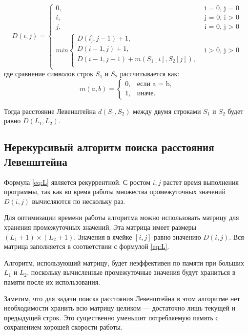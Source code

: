 \begin{equation}
	\label{eq:L}
	D(i, j) =
	\begin{cases}
		0, &\text{i = 0, j = 0}\\
		i, &\text{j = 0, i > 0}\\
		j, &\text{i = 0, j > 0}\\
		min \begin{cases}
			D(i], j - 1) + 1,\\
			D(i - 1, j) + 1,\\
			D(i - 1, j - 1) +  m(S_{1}[i], S_{2}[j]), \\
		\end{cases}
		&\text{i > 0, j > 0}
	\end{cases}
\end{equation}
где сравнение символов строк $S_1$ и $S_2$ рассчитывается как:
\begin{equation}
	\label{eq:m}
	m(a, b) = \begin{cases}
		0, &\text{если a = b,}\\
		1, &\text{иначе.}
	\end{cases}
\end{equation}


Тогда расстояние Левенштейна $d(S_1, S_2)$ между двумя строками $S_1$ и $S_2$ будет равно $D(L_1, L_2)$.

\subsection{Нерекурсивый алгоритм поиска расстояния Левенштейна}

Формула \ref{eq:L} является рекуррентной. С ростом $i, j$ растет время выполнения программы, так как во время работы множества промежуточных значений $D(i,j)$ вычисляются по нескольку раз.

Для оптимизации времени работы алгоритма можно использовать матрицу для хранения промежуточных значений. Эта матрица имеет размеры $(L_1 + 1) \times (L_2 + 1)$. Значения в ячейке $[i, j]$ равно значению $D(i, j)$. Вся матрица заполняется в соответствии с формулой \ref{eq:L}.

Алгоритм, использующий матрицу, будет неэффективен по памяти при больших $L_1$ и $L_2$, поскольку вычисленные промежуточные значения будут храниться в памяти после их использования.

Заметим, что для задачи поиска расстояния Левенштейна в этом алгоритме нет необходимости хранить всю матрицу целиком --- достаточно лишь текущей и предыдущей строк. Это существенно уменьшит потребляемую память с сохранением хорошей скорости работы.

